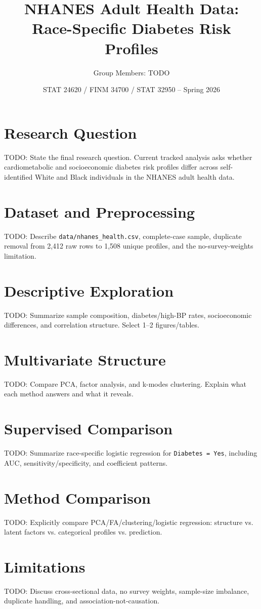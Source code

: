 \documentclass[11pt]{article}
\title{NHANES Adult Health Data: Race-Specific Diabetes Risk Profiles}
\author{Group Members: TODO}
\date{STAT 24620 / FINM 34700 / STAT 32950 -- Spring 2026}
\begin{document}
\maketitle

\section{Research Question}
TODO: State the final research question. Current tracked analysis asks whether cardiometabolic and socioeconomic diabetes risk profiles differ across self-identified White and Black individuals in the NHANES adult health data.

\section{Dataset and Preprocessing}
TODO: Describe \texttt{data/nhanes\_health.csv}, complete-case sample, duplicate removal from 2,412 raw rows to 1,508 unique profiles, and the no-survey-weights limitation.

\section{Descriptive Exploration}
TODO: Summarize sample composition, diabetes/high-BP rates, socioeconomic differences, and correlation structure. Select 1--2 figures/tables.

\section{Multivariate Structure}
TODO: Compare PCA, factor analysis, and k-modes clustering. Explain what each method answers and what it reveals.

\section{Supervised Comparison}
TODO: Summarize race-specific logistic regression for \texttt{Diabetes = Yes}, including AUC, sensitivity/specificity, and coefficient patterns.

\section{Method Comparison}
TODO: Explicitly compare PCA/FA/clustering/logistic regression: structure vs. latent factors vs. categorical profiles vs. prediction.

\section{Limitations}
TODO: Discuss cross-sectional data, no survey weights, sample-size imbalance, duplicate handling, and association-not-causation.
\end{document}
